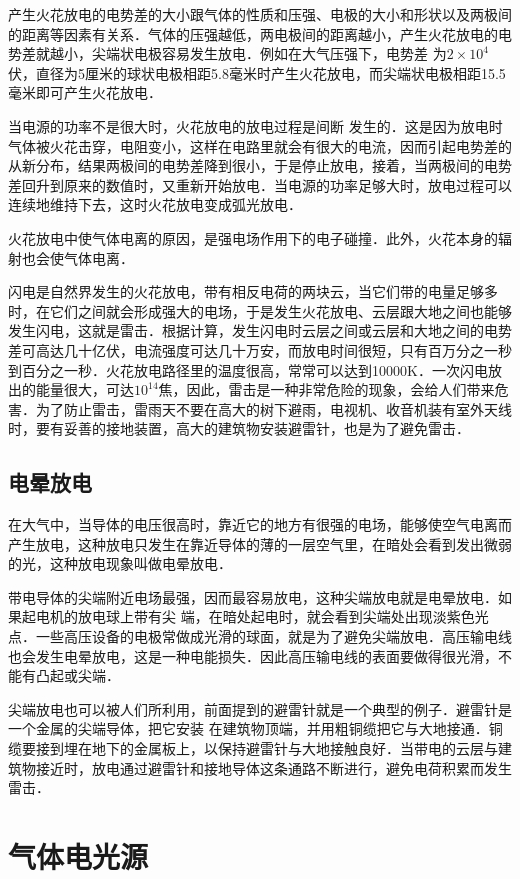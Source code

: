 产生火花放电的电势差的大小跟气体的性质和压强、电极的大小和形状以及两极间的距离等因素有关系．气体的压强越低，两电极间的距离越小，产生火花放电的电势差就越小，尖端状电极容易发生放电．例如在大气压强下，电势差
为$2\times10^4$伏，直径为5厘米的球状电极相距5.8毫米时产生火花放电，而尖端状电极相距15.5毫米即可产生火花放电．

当电源的功率不是很大时，火花放电的放电过程是间断
发生的．这是因为放电时气体被火花击穿，电阻变小，这样在电路里就会有很大的电流，因而引起电势差的从新分布，结果两极间的电势差降到很小，于是停止放电，接着，当两极间的电势差回升到原来的数值时，又重新开始放电．当电源的功率足够大时，放电过程可以连续地维持下去，这时火花放电变成弧光放电．

火花放电中使气体电离的原因，是强电场作用下的电子碰撞．此外，火花本身的辐射也会使气体电离．

闪电是自然界发生的火花放电，带有相反电荷的两块云，当它们带的电量足够多时，在它们之间就会形成强大的电场，于是发生火花放电、云层跟大地之间也能够发生闪电，这就是雷击．根据计算，发生闪电时云层之间或云层和大地之间的电势差可高达几十亿伏，电流强度可达几十万安，而放电时间很短，只有百万分之一秒到百分之一秒．火花放电路径里的温度很高，常常可以达到10000K．一次闪电放出的能量很大，可达$10^{14}$焦，因此，雷击是一种非常危险的现象，会给人们带来危害．为了防止雷击，雷雨天不要在高大的树下避雨，电视机、收音机装有室外天线时，要有妥善的接地装置，高大的建筑物安装避雷针，也是为了避免雷击．

\subsection{电晕放电}


在大气中，当导体的电压很高时，靠近它的地方有很强的电场，能够使空气电离而产生放电，这种放电只发生在靠近导体的薄的一层空气里，在暗处会看到发出微弱的光，这种放电现象叫做电晕放电．

带电导体的尖端附近电场最强，因而最容易放电，这种尖端放电就是电晕放电．如果起电机的放电球上带有尖
端，在暗处起电时，就会看到尖端处出现淡紫色光点．一些高压设备的电极常做成光滑的球面，就是为了避免尖端放电．高压输电线也会发生电晕放电，这是一种电能损失．因此高压输电线的表面要做得很光滑，不能有凸起或尖端．

尖端放电也可以被人们所利用，前面提到的避雷针就是一个典型的例子．避雷针是一个金属的尖端导体，把它安装
在建筑物顶端，并用粗铜缆把它与大地接通．铜缆要接到埋在地下的金属板上，以保持避雷针与大地接触良好．当带电的云层与建筑物接近时，放电通过避雷针和接地导体这条通路不断进行，避免电荷积累而发生雷击．

\section{气体电光源}


